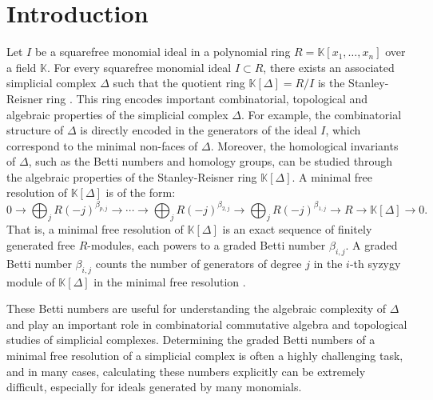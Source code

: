 \documentclass[a4paper,12pt]{amsart}
\numberwithin{equation}{section}
\theoremstyle{definition}
\newcommand{\K}[0]{\mathbb{K}}
\begin{document}
\begin{abstract}
	
\end{abstract}

\section{Introduction}
Let $I$ be a squarefree monomial ideal in a polynomial ring $R=\K[x_1,\dots, x_n]$ over a field $\K$. For every squarefree monomial ideal $I\subset R$, there exists an associated simplicial complex $\Delta$ such that the quotient ring $\K[\Delta]=R/I$ is the Stanley-Reisner ring \cite{Stanley1975}. This ring encodes important combinatorial, topological and algebraic properties of the simplicial complex $\Delta$. For example, the combinatorial structure of $\Delta$ is directly encoded in the generators of the ideal $I$, which correspond to the minimal non-faces of $\Delta$. Moreover, the homological invariants of $\Delta$, such as the Betti numbers and homology groups, can be studied through the algebraic properties of the Stanley-Reisner ring $\K[\Delta]$. A minimal free resolution of $\K[\Delta]$ is of the form:
\begin{equation*}
	0\longrightarrow\bigoplus_{j}R(-j)^{\beta_{p, j}}\longrightarrow\cdots\longrightarrow\bigoplus_{j}R(-j)^{\beta_{2, j}}\longrightarrow\bigoplus_{j}R(-j)^{\beta_{1, j}}\longrightarrow R\longrightarrow \K[\Delta]\longrightarrow0.
\end{equation*}
That is, a minimal free resolution of $\K[\Delta]$ is an exact sequence of finitely generated free $R$-modules, each powers to a graded Betti number $\beta_{i,j}$. A graded Betti number $\beta_{i,j}$ counts the number of generators of degree $j$ in the $i$-th syzygy module of $\K[\Delta]$ in the minimal free resolution \cite{Peeva2011}. 

These Betti numbers are useful for understanding the algebraic complexity of $\Delta$ and play an important role in combinatorial commutative algebra and topological studies of simplicial complexes. Determining the graded Betti numbers of a minimal free resolution of a simplicial complex is often a highly challenging task, and in many cases, calculating these numbers explicitly can be extremely difficult, especially for ideals generated by many monomials.
\end{document}
